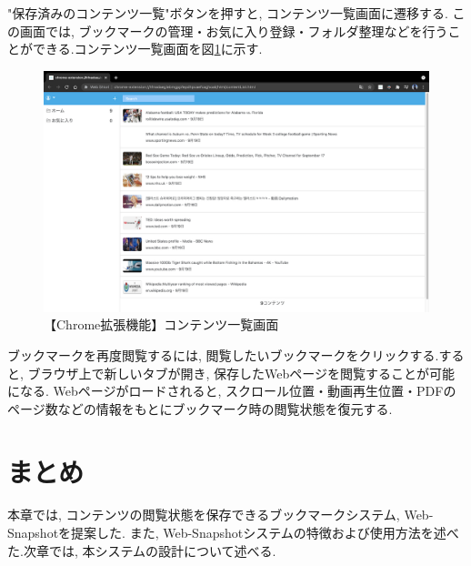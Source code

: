 "保存済みのコンテンツ一覧"ボタンを押すと, コンテンツ一覧画面に遷移する.
この画面では, ブックマークの管理・お気に入り登録・フォルダ整理などを行うことができる.コンテンツ一覧画面を図\ref{fig:usage-chrome-list}に示す.

\begin{figure}[htbp]
  \caption{【Chrome拡張機能】コンテンツ一覧画面}
  \label{fig:usage-chrome-list}
  \begin{center}
    \includegraphics[bb=0 0 915 667,width=15cm]{img/usage-chrome-list.pdf}
  \end{center}
\end{figure}

ブックマークを再度閲覧するには, 閲覧したいブックマークをクリックする.すると, ブラウザ上で新しいタブが開き, 保存したWebページを閲覧することが可能になる.
Webページがロードされると, スクロール位置・動画再生位置・PDFのページ数などの情報をもとにブックマーク時の閲覧状態を復元する.

\section{まとめ}
本章では, コンテンツの閲覧状態を保存できるブックマークシステム, Web-Snapshotを提案した.
また, Web-Snapshotシステムの特徴および使用方法を述べた.次章では, 本システムの設計について述べる.